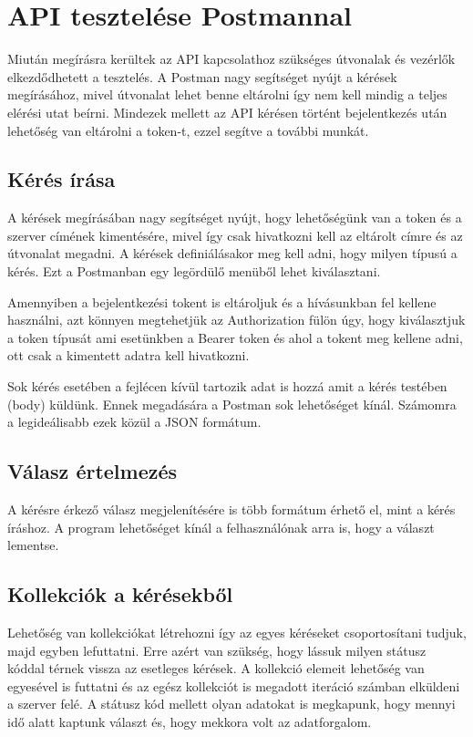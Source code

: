 \documentclass[
]{thesis-ekf}
\theoremstyle{definition}
\theoremstyle{remark}
\begin{document}
\chapter{API tesztelése Postmannal}
Miután megírásra kerültek az API kapcsolathoz szükséges útvonalak és vezérlők elkezdődhetett a tesztelés. A Postman nagy segítséget nyújt a kérések megírásához, mivel útvonalat lehet benne eltárolni így nem kell mindig a teljes elérési utat beírni. Mindezek mellett az API kérésen történt bejelentkezés után lehetőség van eltárolni a token-t, ezzel segítve a további munkát. 

\section{Kérés írása}
A kérések megírásában nagy segítséget nyújt, hogy lehetőségünk van a token és a szerver címének kimentésére, mivel így csak hivatkozni kell az eltárolt címre és az útvonalat megadni. A kérések definiálásakor meg kell adni, hogy milyen típusú a kérés. Ezt a Postmanban egy legördülő menüből lehet kiválasztani. 

Amennyiben a bejelentkezési tokent is eltároljuk és a hívásunkban fel kellene használni, azt könnyen megtehetjük az Authorization fülön úgy, hogy kiválasztjuk a token típusát ami esetünkben a Bearer token és ahol a tokent meg kellene adni, ott csak a kimentett adatra kell hivatkozni. 

Sok kérés esetében a fejlécen kívül tartozik adat is hozzá amit a kérés testében (body) küldünk. Ennek megadására a Postman sok lehetőséget kínál. Számomra a legideálisabb ezek közül a JSON formátum. 

\section{Válasz értelmezés}
A kérésre érkező válasz megjelenítésére is több formátum érhető el, mint a kérés íráshoz. A program lehetőséget kínál a felhasználónak arra is, hogy a választ lementse.

\section{Kollekciók a kérésekből}
Lehetőség van kollekciókat létrehozni így az egyes kéréseket csoportosítani tudjuk, majd egyben lefuttatni. Erre azért van szükség, hogy lássuk milyen státusz kóddal térnek vissza az esetleges kérések. A kollekció elemeit lehetőség van egyesével is futtatni és az egész kollekciót is megadott iteráció számban elküldeni a szerver felé. A státusz kód mellett olyan adatokat is megkapunk, hogy mennyi idő alatt kaptunk választ és, hogy mekkora volt az adatforgalom. 
\end{document}
